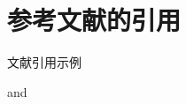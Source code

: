 \documentclass{ctexart}
\begin{document}


\section{参考文献的引用}\label{my label}

文献引用示例 \cite{Tadmor2012,Shen1994,CaiFuLiuWang2022}

\cite{Adams2003,Tadmor2012} and \cite{Shen1994}

\cite{ShiShi2013}

\printbibliography[title=参考文献]
\end{document}
